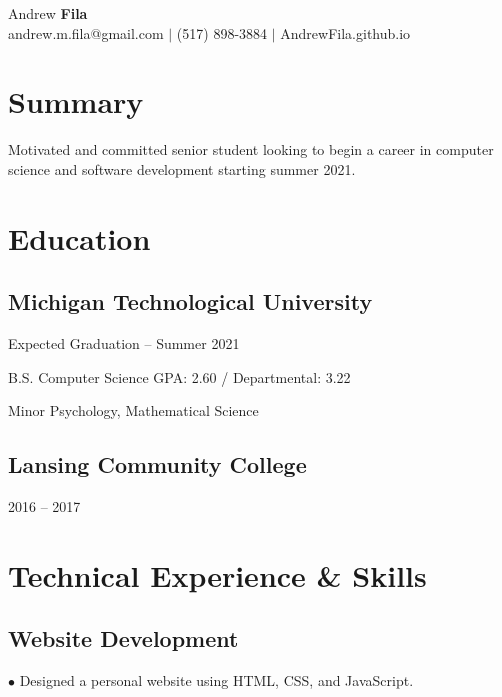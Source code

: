 \documentclass[12pt]{article}
\begin{document}
\begin{center}
    {\fontsize{40}{10}\selectfont Andrew {\bfseries Fila}}\\
    \hspace{-1.5em}andrew.m.fila@gmail.com\hspace{.05in} $|$
    (517) 898-3884\hspace{.05in} $|$
    AndrewFila.github.io\hspace{.05in}
\end{center}

\section{Summary}
Motivated and committed senior student looking to begin a career in computer science and software development starting summer 2021.



\section{Education}
\subsection{Michigan Technological University} \hfill Expected Graduation -- Summer 2021

B.S. Computer Science \hfill GPA: 2.60 / Departmental: 3.22

Minor Psychology, Mathematical Science
%
\subsection{Lansing Community College}\hfill
%
2016 -- 2017


\section{Technical Experience \& Skills}
\subsection{Website Development}\hfill

$\bullet$ Designed a personal website using HTML, CSS, and JavaScript.
\end{document}
